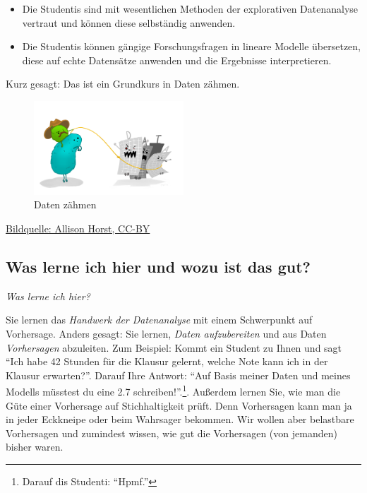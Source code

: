 \documentclass[
  a4paper,
  DIV=11]{scrreprt}
\theoremstyle{definition}
\theoremstyle{definition}
\theoremstyle{definition}
\theoremstyle{remark}
\begin{document}
\begin{itemize}
\item
  Die Studentis sind mit wesentlichen Methoden der explorativen
  Datenanalyse vertraut und können diese selbständig anwenden.
\item
  Die Studentis können gängige Forschungsfragen in lineare Modelle
  übersetzen, diese auf echte Datensätze anwenden und die Ergebnisse
  interpretieren.
\end{itemize}

Kurz gesagt: Das ist ein Grundkurs in Daten zähmen.

\begin{figure}[H]

{\centering \includegraphics[width=0.5\textwidth,height=\textheight]{img/datenzaehmen.png}

}

\caption{Daten zähmen}

\end{figure}%

\href{https://github.com/allisonhorst/stats-illustrations}{Bildquelle:
Allison Horst, CC-BY}

\subsection{Was lerne ich hier und wozu ist das
gut?}\label{was-lerne-ich-hier-und-wozu-ist-das-gut}

\emph{Was lerne ich hier?}

Sie lernen das \emph{Handwerk der Datenanalyse} mit einem Schwerpunkt
auf Vorhersage. Anders gesagt: Sie lernen, \emph{Daten aufzubereiten}
und aus Daten \emph{Vorhersagen} abzuleiten. Zum Beispiel: Kommt ein
Student zu Ihnen und sagt ``Ich habe 42 Stunden für die Klausur gelernt,
welche Note kann ich in der Klausur erwarten?''. Darauf Ihre Antwort:
``Auf Basis meiner Daten und meines Modells müsstest du eine 2.7
schreiben!''.\footnote{Darauf dis Studenti: ``Hpmf.''}. Außerdem lernen
Sie, wie man die Güte einer Vorhersage auf Stichhaltigkeit prüft. Denn
Vorhersagen kann man ja in jeder Eckkneipe oder beim Wahrsager bekommen.
Wir wollen aber belastbare Vorhersagen und zumindest wissen, wie gut die
Vorhersagen (von jemanden) bisher waren.
\end{document}
